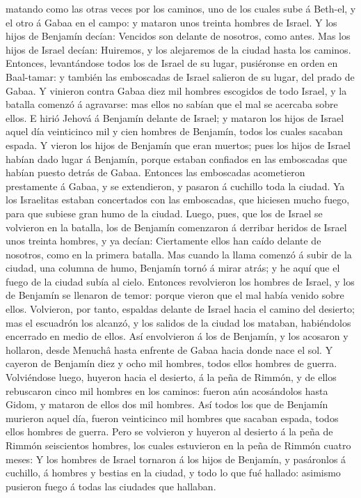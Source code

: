 matando como las otras veces por los caminos, uno de los cuales sube á
Beth-el, y el otro á Gabaa en el campo: y mataron unos treinta hombres
de Israel.  Y los hijos de Benjamín decían: Vencidos son
delante de nosotros, como antes. Mas los hijos de Israel decían:
Huiremos, y los alejaremos de la ciudad hasta los caminos. 
Entonces, levantándose todos los de Israel de su lugar, pusiéronse en
orden en Baal-tamar: y también las emboscadas de Israel salieron de su
lugar, del prado de Gabaa.  Y vinieron contra Gabaa diez
mil hombres escogidos de todo Israel, y la batalla comenzó á agravarse:
mas ellos no sabían que el mal se acercaba sobre ellos.  E
hirió Jehová á Benjamín delante de Israel; y mataron los hijos de Israel
aquel día veinticinco mil y cien hombres de Benjamín, todos los cuales
sacaban espada.  Y vieron los hijos de Benjamín que eran
muertos; pues los hijos de Israel habían dado lugar á Benjamín, porque
estaban confiados en las emboscadas que habían puesto detrás de Gabaa.
 Entonces las emboscadas acometieron prestamente á Gabaa, y
se extendieron, y pasaron á cuchillo toda la ciudad.  Ya
los Israelitas estaban concertados con las emboscadas, que hiciesen
mucho fuego, para que subiese gran humo de la ciudad. 
Luego, pues, que los de Israel se volvieron en la batalla, los de
Benjamín comenzaron á derribar heridos de Israel unos treinta hombres, y
ya decían: Ciertamente ellos han caído delante de nosotros, como en la
primera batalla.  Mas cuando la llama comenzó á subir de la
ciudad, una columna de humo, Benjamín tornó á mirar atrás; y he aquí que
el fuego de la ciudad subía al cielo.  Entonces revolvieron
los hombres de Israel, y los de Benjamín se llenaron de temor: porque
vieron que el mal había venido sobre ellos.  Volvieron, por
tanto, espaldas delante de Israel hacia el camino del desierto; mas el
escuadrón los alcanzó, y los salidos de la ciudad los mataban,
habiéndolos encerrado en medio de ellos.  Así envolvieron á
los de Benjamín, y los acosaron y hollaron, desde Menuchâ hasta enfrente
de Gabaa hacia donde nace el sol.  Y cayeron de Benjamín
diez y ocho mil hombres, todos ellos hombres de guerra. 
Volviéndose luego, huyeron hacia el desierto, á la peña de Rimmón, y de
ellos rebuscaron cinco mil hombres en los caminos: fueron aún
acosándolos hasta Gidom, y mataron de ellos dos mil hombres.
 Así todos los que de Benjamín murieron aquel día, fueron
veinticinco mil hombres que sacaban espada, todos ellos hombres de
guerra.  Pero se volvieron y huyeron al desierto á la peña
de Rimmón seiscientos hombres, los cuales estuvieron en la peña de
Rimmón cuatro meses:  Y los hombres de Israel tornaron á
los hijos de Benjamín, y pasáronlos á cuchillo, á hombres y bestias en
la ciudad, y todo lo que fué hallado: asimismo pusieron fuego á todas
las ciudades que hallaban.


